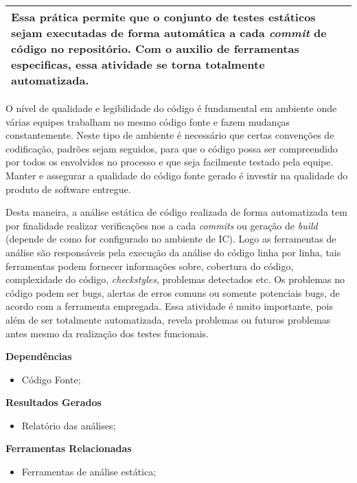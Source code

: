 \begin{table}[!ht]
\centering
\begin{tabular}{|p{130mm}|}
\hline
Essa prática permite que o conjunto de testes estáticos sejam executadas de forma automática a cada \textit{commit} de código no repositório. Com o auxilio de ferramentas especificas, essa atividade se torna totalmente automatizada. \\ 
\hline
\end{tabular}
\end{table}

O nível de qualidade e legibilidade do código é fundamental em ambiente onde várias equipes trabalham no mesmo código fonte e fazem mudanças constantemente. Neste tipo de ambiente é necessário que certas convenções de codificação, padrões sejam seguidos, para que o código possa ser compreendido por todos os envolvidos no processo e que seja facilmente testado pela equipe. Manter e assegurar a qualidade do código fonte gerado é investir na qualidade do produto de software entregue.

Desta maneira, a análise estática de código realizada de forma automatizada tem por finalidade realizar verificações nos a cada \textit{commits} ou geração de \textit{build} (depende de como for configurado no ambiente de IC). Logo as ferramentas de análise são responsáveis pela execução da análise do código linha por linha, tais ferramentas podem fornecer informações sobre, cobertura do código, complexidade do código, \textit{checkstyles}, problemas detectados etc. Os problemas no código podem ser bugs, alertas de erros comuns ou somente potenciais bugs, de acordo com a ferramenta empregada. Essa atividade é muito importante, pois além de ser totalmente automatizada, revela problemas ou futuros problemas antes mesmo da realização dos testes funcionais.

\textbf{Dependências}
\begin{itemize}
    \item Código Fonte;
\end{itemize}

\textbf{ Resultados Gerados}
\begin{itemize}
    \item Relatório das análises;
\end{itemize}

\textbf{Ferramentas Relacionadas}
\begin{itemize}
    \item Ferramentas de análise estática;
\end{itemize}

